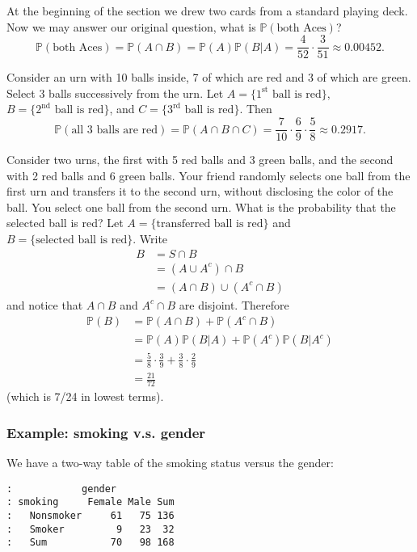 \label{exa-two-cards-both-aces} At the beginning of the section we drew
two cards from a standard playing deck. Now we may answer our original
question, what is \(\mathbb{P}(\mbox{both Aces})\)?  \[
\mathbb{P}(\mbox{both Aces})=\mathbb{P}(A\cap
B)=\mathbb{P}(A)\mathbb{P}(B|A)=\frac{4}{52}\cdot\frac{3}{51}\approx0.00452.
\]

\label{exa-urn-7-red-3-green} Consider an urn with 10 balls inside, 7 of
which are red and 3 of which are green. Select 3 balls successively
from the urn. Let \( A = \{ 1^{\mathrm{st}} \mbox{ ball is red} \} \),
\( B = \{ 2^{\mathrm{nd}} \mbox{ ball is red} \} \), and \( C = \{
3^{\mathrm{rd}} \mbox{ ball is red} \} \). Then \[
\mathbb{P}(\mbox{all 3 balls are red})=\mathbb{P}(A\cap B\cap
C)=\frac{7}{10}\cdot\frac{6}{9}\cdot\frac{5}{8}\approx 0.2917.  \]

Consider two urns, the first with 5 red balls and 3 green balls, and
the second with 2 red balls and 6 green balls. Your friend randomly
selects one ball from the first urn and transfers it to the second
urn, without disclosing the color of the ball. You select one ball
from the second urn. What is the probability that the selected ball is
red? Let \( A = \{ \mbox{transferred ball is red} \} \) and \( B = \{
\mbox{selected ball is red} \} \). Write
\begin{align*}
B & =S\cap B\\
 & =(A\cup A^{c})\cap B\\
 & =(A\cap B)\cup(A^{c}\cap B)
\end{align*}
and notice that \(A\cap B\) and \(A^{c}\cap B\) are disjoint. Therefore
\begin{align*}
\mathbb{P}(B) & =\mathbb{P}(A\cap B)+\mathbb{P}(A^{c}\cap B)\\
 & =\mathbb{P}(A)\mathbb{P}(B|A)+\mathbb{P}(A^{c})\mathbb{P}(B|A^{c})\\
 & =\frac{5}{8}\cdot\frac{3}{9}+\frac{3}{8}\cdot\frac{2}{9}\\
 & =\frac{21}{72}\ 
\end{align*}
(which is 7/24 in lowest terms).


\subsubsection{Example: smoking v.s. gender}

We have a two-way table of the smoking status versus the gender:

\begin{verbatim}
:            gender
: smoking     Female Male Sum
:   Nonsmoker     61   75 136
:   Smoker         9   23  32
:   Sum           70   98 168
\end{verbatim}

